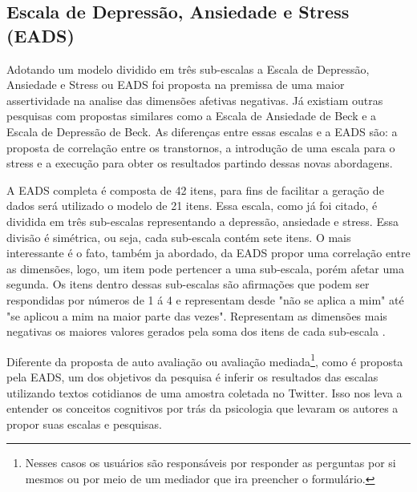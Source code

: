 \subsection{Escala de Depressão, Ansiedade e Stress (EADS)}
Adotando um modelo dividido em três sub-escalas a Escala de Depressão, Ansiedade e Stress ou EADS foi proposta na premissa de uma maior assertividade na analise das dimensões afetivas negativas. Já existiam outras pesquisas com propostas similares como a Escala de Ansiedade de Beck e a Escala de Depressão de Beck. As diferenças entre essas escalas e a EADS são: a proposta de correlação entre os transtornos, a introdução de uma escala para o stress e a execução para obter os resultados partindo dessas novas abordagens.

A EADS completa é composta de 42 itens, para fins de facilitar a geração de dados será utilizado o modelo de 21 itens. Essa escala, como já foi citado, é dividida em três sub-escalas representando a depressão, ansiedade e stress. Essa divisão é simétrica, ou seja, cada sub-escala contém sete itens. O mais interessante é o fato, também ja abordado, da EADS propor uma correlação entre as dimensões, logo, um item pode pertencer a uma sub-escala, porém afetar uma segunda. Os itens dentro dessas sub-escalas são afirmações que podem ser respondidas por números de 1 á 4 e representam desde "não se aplica a mim" até "se aplicou a mim na maior parte das vezes". Representam as dimensões mais negativas os maiores valores gerados pela soma dos itens de cada sub-escala \cite{lovibond1995structure, ribeiro2004contribuiccao}.

Diferente da proposta de auto avaliação ou avaliação mediada\footnote{Nesses casos os usuários são responsáveis por responder as perguntas por si mesmos ou por meio de um mediador que ira preencher o formulário.}, como é proposta pela EADS,  um dos objetivos da pesquisa é inferir os resultados das escalas utilizando textos cotidianos de uma amostra coletada no Twitter. Isso nos leva a entender os conceitos cognitivos por trás da psicologia que levaram os autores a propor suas escalas e pesquisas.
